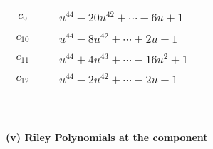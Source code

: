 \documentclass[1p]{elsarticle_modified}
\theoremstyle{definition}
\begin{document}
\begin{tabular}{m{50pt}|m{274pt}}
\hline $$\begin{aligned}c_{9}\end{aligned}$$&$\begin{aligned}
&u^{44}-20 u^{42}+\cdots-6 u+1
\end{aligned}$\\
\hline $$\begin{aligned}c_{10}\end{aligned}$$&$\begin{aligned}
&u^{44}-8 u^{42}+\cdots+2 u+1
\end{aligned}$\\
\hline $$\begin{aligned}c_{11}\end{aligned}$$&$\begin{aligned}
&u^{44}+4 u^{43}+\cdots-16 u^2+1
\end{aligned}$\\
\hline $$\begin{aligned}c_{12}\end{aligned}$$&$\begin{aligned}
&u^{44}-2 u^{42}+\cdots-2 u+1
\end{aligned}$\\
\hline
\end{tabular}\\~\\
\newpage\renewcommand{\arraystretch}{1}
\flushleft \textbf{(v) Riley Polynomials at the component}\newline \\
\end{document}
